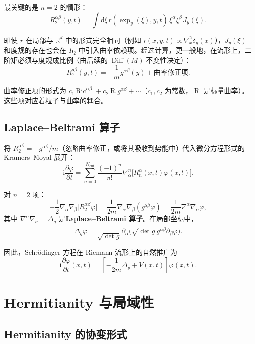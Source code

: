 \documentclass{book}
\newcommand{\mathd}{\mathrm{d}}
\newcommand{\mathi}{\mathrm{i}}
\begin{document}
最关键的是 $n=2$ 的情形：
\[
R_2^{\alpha\beta}(y,t) = \int \mathd\xi \, r(\exp_y(\xi), y, t) \, \xi^\alpha \xi^\beta \, J_y(\xi).
\]

即使 $r$ 在局部与 $\mathbb{R}^d$ 中的形式完全相同（例如 $r(x,y,t) \propto \nabla_x^2 \delta_y(x)$），$J_y(\xi)$ 和度规的存在也会在 $R_2$ 中引入曲率依赖项。经过计算，更一般地，在流形上，二阶矩必须与度规成比例（由后续的 $\operatorname{Diff}(M)$ 不变性决定）：
\begin{equation}
  R_2^{\alpha\beta}(y,t) = -\frac{1}{m} g^{\alpha\beta}(y) + \text{曲率修正项}. \label{eq:R2-curv}
\end{equation}

曲率修正项的形式为 $c_1 \operatorname{Ric}^{\alpha\beta} + c_2 \operatorname{R} g^{\alpha\beta} + \cdots$（$c_1,c_2$ 为常数，$\operatorname{R}$ 是标量曲率）。这些项对应着粒子与曲率的耦合。

\section{Laplace--Beltrami 算子}

将 $R_2^{\alpha\beta} = -g^{\alpha\beta}/m$（忽略曲率修正，或将其吸收到势能中）代入微分方程形式的 Kramers--Moyal 展开：
\[
\mathi \frac{\partial\varphi}{\partial t} = \sum_{n=0}^{N_\text{cut}} \frac{(-1)^n}{n!} \nabla_\alpha^n \bigl[ R_n^\alpha(x,t) \varphi(x,t) \bigr].
\]

对 $n=2$ 项：
\[
-\frac{1}{2} \nabla_\alpha \nabla_\beta \bigl[ R_2^{\alpha\beta} \varphi \bigr] = \frac{1}{2m} \nabla_\alpha \nabla_\beta (g^{\alpha\beta} \varphi) = \frac{1}{2m} \nabla^\alpha \nabla_\alpha \varphi,
\]
其中 $\nabla^\alpha \nabla_\alpha = \Delta_g$ 是\textbf{Laplace--Beltrami 算子}。在局部坐标中，
\[
\Delta_g \varphi = \frac{1}{\sqrt{\det g}} \partial_\alpha \bigl( \sqrt{\det g} \, g^{\alpha\beta} \partial_\beta \varphi \bigr).
\]

因此，Schrödinger 方程在 Riemann 流形上的自然推广为
\begin{equation}
  \mathi \frac{\partial\varphi}{\partial t}(x,t) = \left[ -\frac{1}{2m} \Delta_g + V(x,t) \right] \varphi(x,t). \label{eq:schrodinger-manifold}
\end{equation}

\chapter{Hermitianity 与局域性}

\section{Hermitianity 的协变形式}
\end{document}
